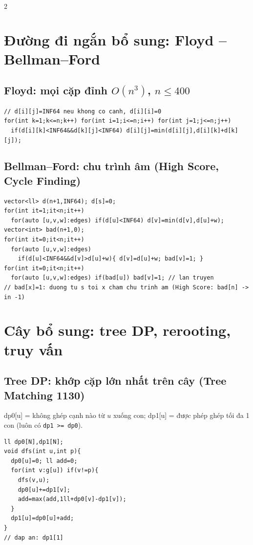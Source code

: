 \documentclass[8pt]{extarticle}
\begin{document}
\begin{multicols}{2}
\section{Đường đi ngắn bổ sung: Floyd -- Bellman--Ford}
\subsection{Floyd: mọi cặp đỉnh $O(n^3)$, $n\le 400$}
\begin{lstlisting}
// d[i][j]=INF64 neu khong co canh, d[i][i]=0
for(int k=1;k<=n;k++) for(int i=1;i<=n;i++) for(int j=1;j<=n;j++)
  if(d[i][k]<INF64&&d[k][j]<INF64) d[i][j]=min(d[i][j],d[i][k]+d[k][j]);
\end{lstlisting}

\subsection{Bellman--Ford: chu trình âm (High Score, Cycle Finding)}
\begin{lstlisting}
vector<ll> d(n+1,INF64); d[s]=0;
for(int it=1;it<n;it++)
  for(auto [u,v,w]:edges) if(d[u]<INF64) d[v]=min(d[v],d[u]+w);
vector<int> bad(n+1,0);
for(int it=0;it<n;it++)
  for(auto [u,v,w]:edges)
    if(d[u]<INF64&&d[v]>d[u]+w){ d[v]=d[u]+w; bad[v]=1; }
for(int it=0;it<n;it++)
  for(auto [u,v,w]:edges) if(bad[u]) bad[v]=1; // lan truyen
// bad[x]=1: duong tu s toi x cham chu trinh am (High Score: bad[n] -> in -1)
\end{lstlisting}

\section{Cây bổ sung: tree DP, rerooting, truy vấn}
\subsection{Tree DP: khớp cặp lớn nhất trên cây (Tree Matching 1130)}
dp0[u] = không ghép cạnh nào từ $u$ xuống con; dp1[u] = được phép ghép tối đa 1 con (luôn có \texttt{dp1 >= dp0}).
\begin{lstlisting}
ll dp0[N],dp1[N];
void dfs(int u,int p){
  dp0[u]=0; ll add=0;
  for(int v:g[u]) if(v!=p){
    dfs(v,u);
    dp0[u]+=dp1[v];
    add=max(add,1ll+dp0[v]-dp1[v]);
  }
  dp1[u]=dp0[u]+add;
}
// dap an: dp1[1]
\end{lstlisting}


\end{multicols}
\end{document}
